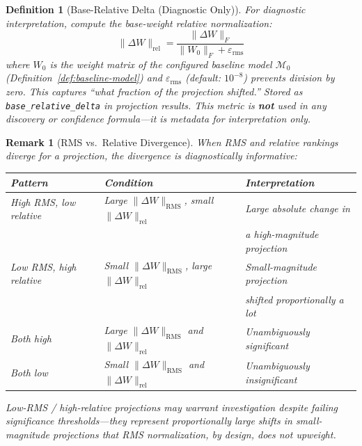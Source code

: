 \documentclass[11pt]{article}
\newtheorem{definition}{Definition}[section]
\newtheorem{remark}{Remark}[section]
\begin{document}
\begin{definition}[Base-Relative Delta (Diagnostic Only)]
\label{def:base-relative-delta}
For diagnostic interpretation, compute the base-weight relative normalization:
\begin{equation}
\|\Delta W\|_{\text{rel}} = \frac{\|\Delta W\|_F}{\|W_0\|_F + \varepsilon_{\text{rms}}}
\end{equation}
where $W_0$ is the weight matrix of the configured baseline model $\mathcal{M}_0$ (Definition~\ref{def:baseline-model}) and $\varepsilon_{\text{rms}}$ (default: $10^{-8}$) prevents division by zero. This captures ``what fraction of the projection shifted.'' Stored as \texttt{base\_relative\_delta} in projection results. This metric is \textbf{not} used in any discovery or confidence formula---it is metadata for interpretation only.
\end{definition}

\begin{remark}[RMS vs.\ Relative Divergence]
\label{rem:rms-vs-relative-divergence}
When RMS and relative rankings diverge for a projection, the divergence is diagnostically informative:
\begin{center}
\begin{tabular}{lll}
\toprule
\textbf{Pattern} & \textbf{Condition} & \textbf{Interpretation} \\
\midrule
High RMS, low relative & Large $\|\Delta W\|_{\text{RMS}}$, small $\|\Delta W\|_{\text{rel}}$ & Large absolute change in \\
& & a high-magnitude projection \\
Low RMS, high relative & Small $\|\Delta W\|_{\text{RMS}}$, large $\|\Delta W\|_{\text{rel}}$ & Small-magnitude projection \\
& & shifted proportionally a lot \\
Both high & Large $\|\Delta W\|_{\text{RMS}}$ and $\|\Delta W\|_{\text{rel}}$ & Unambiguously significant \\
Both low & Small $\|\Delta W\|_{\text{RMS}}$ and $\|\Delta W\|_{\text{rel}}$ & Unambiguously insignificant \\
\bottomrule
\end{tabular}
\end{center}
\noindent Low-RMS / high-relative projections may warrant investigation despite failing significance thresholds---they represent proportionally large shifts in small-magnitude projections that RMS normalization, by design, does not upweight.
\end{remark}
\end{document}
